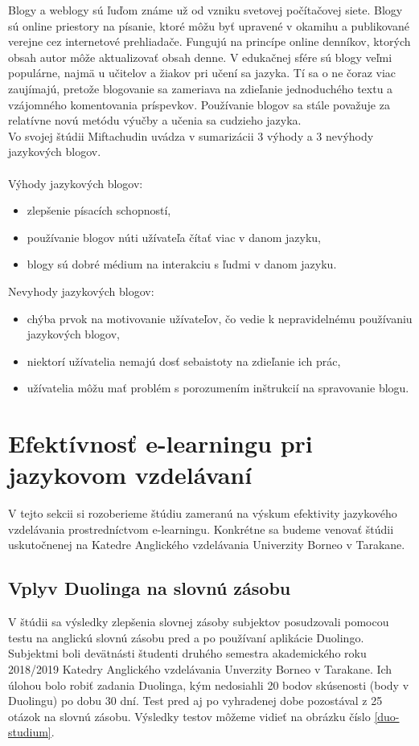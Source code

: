 \documentclass[10pt,oneside,slovak,a4paper]{article}
\begin{document}
Blogy a weblogy sú ľuďom známe už od vzniku svetovej počítačovej siete. Blogy sú online priestory na písanie, ktoré môžu byť upravené v okamihu a publikované verejne cez internetové prehliadače. Fungujú na princípe online denníkov, ktorých obsah autor môže aktualizovať obsah denne. V edukačnej sfére sú blogy veľmi  populárne, najmä u učitelov a žiakov pri učení sa jazyka. Tí sa o ne čoraz viac zaujímajú, pretože blogovanie sa zameriava na zdieľanie jednoduchého textu a vzájomného komentovania príspevkov. Používanie blogov sa stále považuje za relatívne novú metódu výučby a učenia sa cudzieho jazyka. \cite{blog-mif}\\
Vo svojej štúdii Miftachudin \cite{blog-mif} uvádza v sumarizácii 3 výhody a 3 nevýhody jazykových blogov.\\
\\
Výhody jazykových blogov:
\begin{itemize}
\item zlepšenie písacích schopností,
\item používanie blogov núti užívateľa čítať viac v danom jazyku,
\item blogy sú dobré médium na interakciu s ľudmi v danom jazyku. \cite{blog-mif}
\end{itemize}
Nevyhody jazykových blogov:
\begin{itemize}
\item chýba prvok na motivovanie užívateľov, čo vedie k nepravidelnému používaniu jazykových blogov,
\item niektorí užívatelia nemajú dosť sebaistoty na zdieľanie ich prác,
\item užívatelia môžu mať problém s porozumením inštrukcií na spravovanie blogu. \cite{blog-mif}
\end{itemize}



\section{Efektívnosť e-learningu pri jazykovom vzdelávaní}
\label{3}
V tejto sekcii si rozoberieme štúdiu zameranú na výskum efektivity jazykového vzdelávania prostredníctvom e-learningu. Konkrétne sa budeme venovať štúdii uskutočnenej na Katedre Anglického vzdelávania Univerzity Borneo v Tarakane.

\subsection{Vplyv Duolinga na slovnú zásobu}
V štúdii sa výsledky zlepšenia slovnej zásoby subjektov posudzovali pomocou testu na anglickú slovnú zásobu pred a po používaní aplikácie Duolingo. Subjektmi boli devätnásti študenti druhého semestra akademického roku 2018/2019 Katedry Anglického vzdelávania Unverzity Borneo v Tarakane. Ich úlohou bolo robiť zadania Duolinga, kým nedosiahli 20 bodov skúsenosti (body v Duolingu) po dobu 30 dní. Test pred aj po vyhradenej dobe pozostával z 25 otázok na slovnú zásobu. Výsledky testov môžeme vidieť na obrázku číslo \ref{duo-studium}. \cite{duolingo}
\end{document}
